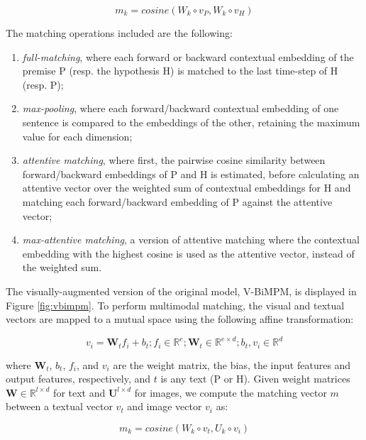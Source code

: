 \documentclass[11pt]{article}
\begin{document}
\begin{equation}
m_{k} = \textit{cosine}\left(W_{k} \circ v_{P}, W_{k} \circ v_{H}\right)
\end{equation}

\noindent
The matching operations included are the following:

\begin{enumerate}
\item {\em full-matching}, where each forward or backward contextual embedding of the premise P (resp. the hypothesis H) is matched to the last time-step of H (resp. P); 
\item {\em max-pooling}, where each forward/backward contextual embedding of one sentence is compared to the embeddings of the other, retaining the maximum value for each dimension; 
\item {\em attentive matching}, where first, the pairwise cosine similarity between forward/backward embeddings of P and H is estimated, before calculating an attentive vector over the weighted sum of contextual embeddings for H and matching each forward/backward embedding of P against the attentive vector;
\item {\em max-attentive matching}, a version of attentive matching where the contextual embedding with the highest cosine is used as the attentive vector, instead of the weighted sum. 
\end{enumerate}

\noindent
The visually-augmented version of the original model, V-BiMPM, is displayed in Figure \ref{fig:vbimpm}. To perform multimodal matching, the visual and textual vectors are mapped to a mutual space using the following affine transformation:

\begin{equation}
v_{i} = \mathbf{W}_{t}f_{i}+b_{t}; f_{i} \in \mathbb{R}^{e}; \mathbf{W}_{t} \in \mathbb{R}^{e \times d}; b_{t}, v_{i} \in \mathbb{R}^{d}
\end{equation}

\noindent 
where $\mathbf{W}_{t}$, $b_{t}$,  $f_{i}$, and $v_{i}$ are the weight matrix, the bias, the input features and output features, respectively, and $t$ is any text (P or H). Given weight matrices $\mathbf{W} \in \mathbb{R}^{l \times d}$ for text and $\mathbf{U}^{l \times d}$ for images, we compute the matching vector $m$ between a textual vector $v_{t}$ and image vector $v_{i}$ as:

\begin{equation}
m_{k} = \textit{cosine}\left(W_{k} \circ v_{t}, U_{k} \circ v_{i}\right)
\end{equation}





 

\end{document}
